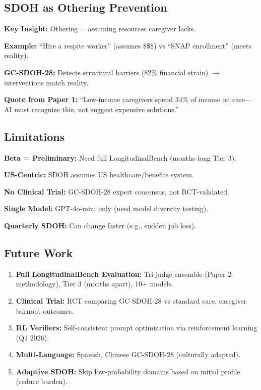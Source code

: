 \documentclass{article}
\begin{document}
%
\subsection{SDOH as Othering Prevention}%
\label{subsec:SDOHasOtheringPrevention}%
\textbf{Key Insight:} Othering = assuming resources caregiver lacks.

\textbf{Example:} ``Hire a respite worker'' (assumes \$\$\$) vs ``SNAP enrollment'' (meets reality).

\textbf{GC-SDOH-28:} Detects structural barriers (82\% financial strain) $\rightarrow$ interventions match reality.

\textbf{Quote from Paper 1:} ``Low-income caregivers spend 34\% of income on care—AI must recognize this, not suggest expensive solutions.''

%
\subsection{Limitations}%
\label{subsec:Limitations}%
\textbf{Beta = Preliminary:} Need full LongitudinalBench (months-long Tier 3).

\textbf{US-Centric:} SDOH assumes US healthcare/benefits system.

\textbf{No Clinical Trial:} GC-SDOH-28 expert consensus, not RCT-validated.

\textbf{Single Model:} GPT-4o-mini only (need model diversity testing).

\textbf{Quarterly SDOH:} Can change faster (e.g., sudden job loss).

%
\subsection{Future Work}%
\label{subsec:FutureWork}%
\begin{enumerate}
    \item \textbf{Full LongitudinalBench Evaluation:} Tri-judge ensemble (Paper 2 methodology), Tier 3 (months apart), 10+ models.
    \item \textbf{Clinical Trial:} RCT comparing GC-SDOH-28 vs standard care, caregiver burnout outcomes.
    \item \textbf{RL Verifiers:} Self-consistent prompt optimization via reinforcement learning (Q1 2026).
    \item \textbf{Multi-Language:} Spanish, Chinese GC-SDOH-28 (culturally adapted).
    \item \textbf{Adaptive SDOH:} Skip low-probability domains based on initial profile (reduce burden).
\end{enumerate}
\end{document}
